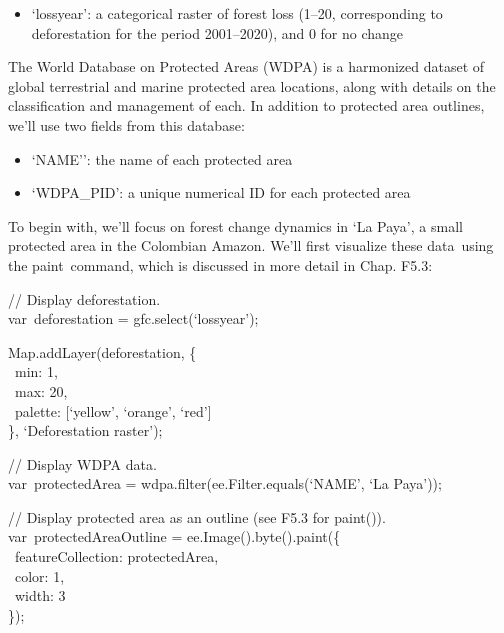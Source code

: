 \documentclass[
  letterpaper,
  DIV=11,
  numbers=noendperiod]{scrreprt}
\providecommand{\tightlist}{%
  \setlength{\itemsep}{0pt}\setlength{\parskip}{0pt}}\usepackage{longtable,booktabs,array}
\begin{document}
\begin{itemize}
\tightlist
\item
  `lossyear': a categorical raster of forest loss (1--20, corresponding
  to deforestation for the period 2001--2020), and 0 for no change
\end{itemize}

The World Database on Protected Areas (WDPA) is a harmonized dataset of
global terrestrial and marine protected area locations, along with
details on the classification and management of each. In addition to
protected area outlines, we'll use two fields from this database:

\begin{itemize}
\tightlist
\item
  `NAME'': the name of each protected area
\item
  `WDPA\_PID': a unique numerical ID for each protected area
\end{itemize}

To begin with, we'll focus on forest change dynamics in `La Paya', a
small protected area in the Colombian Amazon. We'll first visualize
these data~using the paint~command, which is discussed in more detail in
Chap. F5.3:

// Display deforestation.\\
var~deforestation = gfc.select(`lossyear');

Map.addLayer(deforestation, \{\\
\hspace*{0.333em} ~min: 1,\\
\hspace*{0.333em} ~max: 20,\\
\hspace*{0.333em} ~palette: {[}`yellow', `orange', `red'{]}\\
\}, `Deforestation raster');

// Display WDPA data.\\
var~protectedArea = wdpa.filter(ee.Filter.equals(`NAME', `La Paya'));

// Display protected area as an outline (see F5.3 for paint()).\\
var~protectedAreaOutline = ee.Image().byte().paint(\{\\
\hspace*{0.333em} ~featureCollection: protectedArea,\\
\hspace*{0.333em} ~color: 1,\\
\hspace*{0.333em} ~width: 3\\
\});
\end{document}
